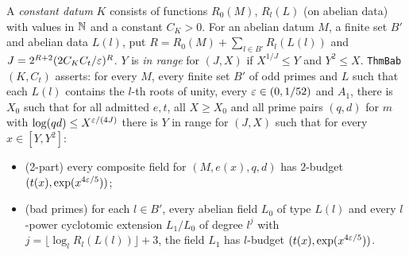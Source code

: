 \begin{definition}\label{sha:thmbab}
A \emph{constant datum} $K$ consists of functions $R_0(M)$, $R_l(L)$ (on abelian data) with
values in $\mathbb{N}$ and a constant $C_K>0$. For an abelian datum $M$, a finite set $B'$ and
abelian data $L(l)$, put $R=R_0(M)+\sum_{l\in B'}R_l(L(l))$ and
$J=2^{R+2}(2C_KC_t/\varepsilon)^R$. $Y$ is \emph{in range} for $(J,X)$ if $X^{1/J}\le Y$ and
$Y^2\le X$. \texttt{ThmBab}$(K,C_t)$ asserts: for every $M$, every finite set $B'$ of odd
primes and $L$ such that each $L(l)$ contains the $l$-th roots of unity, every
$\varepsilon\in(0,1/52)$ and $A_1$, there is $X_0$ such that for all admitted $e,t$, all
$X\ge X_0$ and all prime pairs $(q,d)$ for $m$ with $\log(qd)\le X^{\varepsilon/(4J)}$ there is
$Y$ in range for $(J,X)$ such that for every $x\in[Y,Y^2]$:
\begin{itemize}
\item (2-part) every composite field for $(M,e(x),q,d)$ has $2$-budget
$(t(x),\exp(x^{4\varepsilon/5}))$;
\item (bad primes) for each $l\in B'$, every abelian field $L_0$ of type $L(l)$ and every
$l$-power cyclotomic extension $L_1/L_0$ of degree $l^{j}$ with
$j=\lfloor\log_lR_l(L(l))\rfloor+3$, the field $L_1$ has $l$-budget
$(t(x),\exp(x^{4\varepsilon/5}))$.
\end{itemize}
\end{definition}


